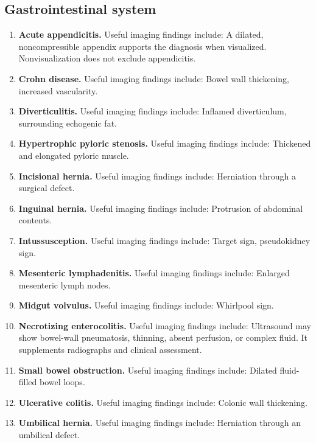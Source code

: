 \subsection{Gastrointestinal system}
\begin{enumerate}[leftmargin=*,itemsep=0.45em,topsep=0.4em]
\item \textbf{Acute appendicitis.} Useful imaging findings include: A dilated, noncompressible appendix supports the diagnosis when visualized. Nonvisualization does not exclude appendicitis.
\item \textbf{Crohn disease.} Useful imaging findings include: Bowel wall thickening, increased vascularity.
\item \textbf{Diverticulitis.} Useful imaging findings include: Inflamed diverticulum, surrounding echogenic fat.
\item \textbf{Hypertrophic pyloric stenosis.} Useful imaging findings include: Thickened and elongated pyloric muscle.
\item \textbf{Incisional hernia.} Useful imaging findings include: Herniation through a surgical defect.
\item \textbf{Inguinal hernia.} Useful imaging findings include: Protrusion of abdominal contents.
\item \textbf{Intussusception.} Useful imaging findings include: Target sign, pseudokidney sign.
\item \textbf{Mesenteric lymphadenitis.} Useful imaging findings include: Enlarged mesenteric lymph nodes.
\item \textbf{Midgut volvulus.} Useful imaging findings include: Whirlpool sign.
\item \textbf{Necrotizing enterocolitis.} Useful imaging findings include: Ultrasound may show bowel-wall pneumatosis, thinning, absent perfusion, or complex fluid. It supplements radiographs and clinical assessment.
\item \textbf{Small bowel obstruction.} Useful imaging findings include: Dilated fluid-filled bowel loops.
\item \textbf{Ulcerative colitis.} Useful imaging findings include: Colonic wall thickening.
\item \textbf{Umbilical hernia.} Useful imaging findings include: Herniation through an umbilical defect.
\end{enumerate}


